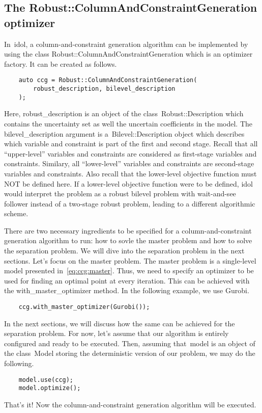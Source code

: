 \subsection{The \textsf{Robust::ColumnAndConstraintGeneration} optimizer}

In~\textsf{idol}, a column-and-constraint generation algorithm can be
implemented by using the class \textsf{Robust::ColumnAndConstraintGeneration}
which is an optimizer factory. It can be created as follows.

\begin{lstlisting}
    auto ccg = Robust::ColumnAndConstraintGeneration(
        robust_description, bilevel_description
    );
\end{lstlisting}
%
Here, \textsf{robust\_description} is an object of the
class~\textsf{Robust::Description} which contains the uncertainty set as well
the uncertain coefficients in the model. The \textsf{bilevel\_description}
argument is a~\textsf{Bilevel::Description} object which describes which
variable and constraint is part of the first and second stage. Recall that all
``upper-level'' variables and constraints are considered as first-stage
variables and constraints. Similary, all ``lower-level'' variables and
constraints are second-stage variables and constraints. Also recall that the
lower-level objective function must NOT be defined here. If a lower-level
objective function were to be defined, \textsf{idol} would interpret the
problem as a robust bilevel problem with wait-and-see follower instead of a
two-stage robust problem, leading to a different algorithmic scheme. 

There are two necessary ingredients to be specified for a
column-and-constraint generation algorithm to run: how to sovle the master
problem and how to solve the separation problem. We will dive into the
separation problem in the next sections. Let's focus on the master problem.
The master problem is a single-level model presented in~\eqref{eq:ccg:master}.
Thus, we need to specify an optimizer to be used for finding an optimal point
at every iteration.  This can be achieved with the
\textsf{with\_master\_optimizer} method. In the following example, we use
\textsf{Gurobi}.
%
\begin{lstlisting}
    ccg.with_master_optimizer(Gurobi());
\end{lstlisting}
%
In the next sections, we will discuss how the same can be achieved for the
separation problem. For now, let's assume that our algorithm is entirely
configured and ready to be executed. Then, assuming that~\textsf{model} is an
object of the class~\textsf{Model} storing the deterministic version of our
problem, we may do the following.
%
\begin{lstlisting}
    model.use(ccg);
    model.optimize();
\end{lstlisting}
That's it! Now the column-and-constraint generation algorithm will be
executed.


